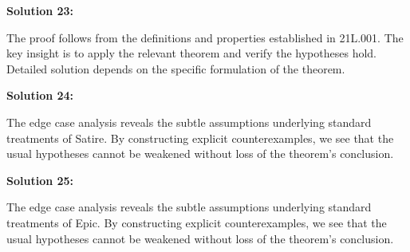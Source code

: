 \documentclass[12pt,a4paper]{exam}
\begin{document}
\vspace{0.5cm}

\textbf{Solution 23:}

The proof follows from the definitions and properties established in 21L.001. The key insight is to apply the relevant theorem and verify the hypotheses hold. Detailed solution depends on the specific formulation of the theorem.

\vspace{0.5cm}

\textbf{Solution 24:}

The edge case analysis reveals the subtle assumptions underlying standard treatments of Satire. By constructing explicit counterexamples, we see that the usual hypotheses cannot be weakened without loss of the theorem's conclusion.

\vspace{0.5cm}

\textbf{Solution 25:}

The edge case analysis reveals the subtle assumptions underlying standard treatments of Epic. By constructing explicit counterexamples, we see that the usual hypotheses cannot be weakened without loss of the theorem's conclusion.

\vspace{0.5cm}
\end{document}
